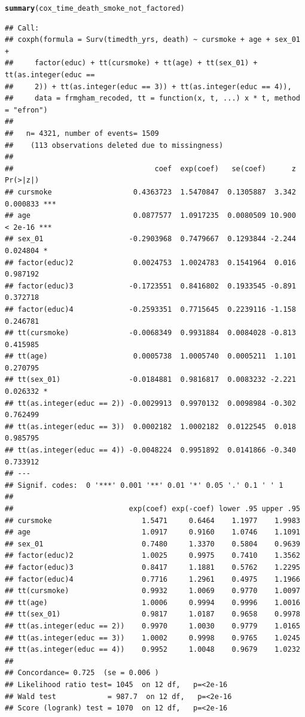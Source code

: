 \documentclass{article}\usepackage[]{graphicx}\usepackage[]{color}
\makeatletter
\newcommand{\hlstd}[1]{\textcolor[rgb]{0.345,0.345,0.345}{#1}}%
\newcommand{\hlkwd}[1]{\textcolor[rgb]{0.737,0.353,0.396}{\textbf{#1}}}%
\newenvironment{kframe}{%
 \def\at@end@of@kframe{}%
 \ifinner\ifhmode%
  \def\at@end@of@kframe{\end{minipage}}%
  \begin{minipage}{\columnwidth}%
 \fi\fi%
 \def\FrameCommand##1{\hskip\@totalleftmargin \hskip-\fboxsep
 \colorbox{shadecolor}{##1}\hskip-\fboxsep
     \hskip-\linewidth \hskip-\@totalleftmargin \hskip\columnwidth}%
 \MakeFramed {\advance\hsize-\width
   \@totalleftmargin\z@ \linewidth\hsize
   \@setminipage}}%
 {\par\unskip\endMakeFramed%
 \at@end@of@kframe}
\newenvironment{knitrout}{}{} %
\makeatother
\begin{document}
\begin{knitrout}
\begin{kframe}
\begin{alltt}
\hlkwd{summary}\hlstd{(cox_time_death_smoke_not_factored)}
\end{alltt}
\begin{verbatim}
## Call:
## coxph(formula = Surv(timedth_yrs, death) ~ cursmoke + age + sex_01 + 
##     factor(educ) + tt(cursmoke) + tt(age) + tt(sex_01) + tt(as.integer(educ == 
##     2)) + tt(as.integer(educ == 3)) + tt(as.integer(educ == 4)), 
##     data = frmgham_recoded, tt = function(x, t, ...) x * t, method = "efron")
## 
##   n= 4321, number of events= 1509 
##    (113 observations deleted due to missingness)
## 
##                                 coef  exp(coef)   se(coef)      z Pr(>|z|)    
## cursmoke                   0.4363723  1.5470847  0.1305887  3.342 0.000833 ***
## age                        0.0877577  1.0917235  0.0080509 10.900  < 2e-16 ***
## sex_01                    -0.2903968  0.7479667  0.1293844 -2.244 0.024804 *  
## factor(educ)2              0.0024753  1.0024783  0.1541964  0.016 0.987192    
## factor(educ)3             -0.1723551  0.8416802  0.1933545 -0.891 0.372718    
## factor(educ)4             -0.2593351  0.7715645  0.2239116 -1.158 0.246781    
## tt(cursmoke)              -0.0068349  0.9931884  0.0084028 -0.813 0.415985    
## tt(age)                    0.0005738  1.0005740  0.0005211  1.101 0.270795    
## tt(sex_01)                -0.0184881  0.9816817  0.0083232 -2.221 0.026332 *  
## tt(as.integer(educ == 2)) -0.0029913  0.9970132  0.0098984 -0.302 0.762499    
## tt(as.integer(educ == 3))  0.0002182  1.0002182  0.0122545  0.018 0.985795    
## tt(as.integer(educ == 4)) -0.0048224  0.9951892  0.0141866 -0.340 0.733912    
## ---
## Signif. codes:  0 '***' 0.001 '**' 0.01 '*' 0.05 '.' 0.1 ' ' 1
## 
##                           exp(coef) exp(-coef) lower .95 upper .95
## cursmoke                     1.5471     0.6464    1.1977    1.9983
## age                          1.0917     0.9160    1.0746    1.1091
## sex_01                       0.7480     1.3370    0.5804    0.9639
## factor(educ)2                1.0025     0.9975    0.7410    1.3562
## factor(educ)3                0.8417     1.1881    0.5762    1.2295
## factor(educ)4                0.7716     1.2961    0.4975    1.1966
## tt(cursmoke)                 0.9932     1.0069    0.9770    1.0097
## tt(age)                      1.0006     0.9994    0.9996    1.0016
## tt(sex_01)                   0.9817     1.0187    0.9658    0.9978
## tt(as.integer(educ == 2))    0.9970     1.0030    0.9779    1.0165
## tt(as.integer(educ == 3))    1.0002     0.9998    0.9765    1.0245
## tt(as.integer(educ == 4))    0.9952     1.0048    0.9679    1.0232
## 
## Concordance= 0.725  (se = 0.006 )
## Likelihood ratio test= 1045  on 12 df,   p=<2e-16
## Wald test            = 987.7  on 12 df,   p=<2e-16
## Score (logrank) test = 1070  on 12 df,   p=<2e-16
\end{verbatim}
\end{kframe}
\end{knitrout}
\end{document}
